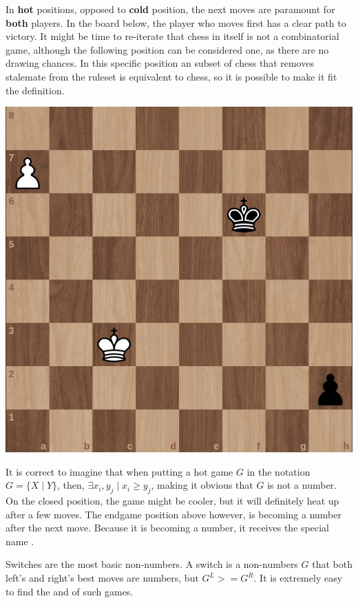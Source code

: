 In \textbf{hot} positions, opposed to \textbf{cold} position, the next moves are paramount for \textbf{both} players. In the board below, the player who moves first has a clear path to victory. It might be time to re-iterate that chess in itself is not a combinatorial game, although the following position can be considered one, as there are no drawing chances. In this specific position an subset of chess that removes stalemate from the ruleset is equivalent to chess, so it is possible to make it fit the definition.

\begin{center}
	\includegraphics[scale=0.15]{images/chess_hot} 
\end{center}

It is correct to imagine that when putting a hot game $G$ in the notation \mbox{$G = \{ X \mid Y\}$}, then, $\exists x_i, y_j \mid x_i \ge y_j$, making it obvious that $G$ is not a number. On the closed position, the game might be cooler, but it will definitely heat up after a few moves. The endgame position above however, is becoming a number after the next move. Because it is becoming a number, it receives the special name .

Switches are the most basic non-numbers. A switch is a non-numbers $G$ that both left's and right's best moves are numbers, but $G^L >= G^R$. It is extremely easy to find the  and  of such games. 

